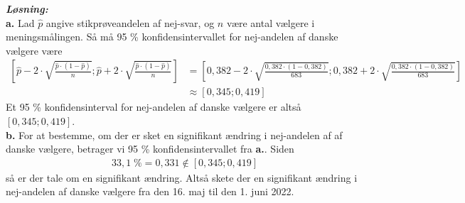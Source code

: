 \documentclass{article}
\newcommand{\sol}{\setlength{\parindent}{0cm}\textbf{\textit{Løsning:}}\setlength{\parindent}{1cm}}
\begin{document}
\sol \\
\textbf{a.}
Lad $\hat p $ angive stikprøveandelen af nej-svar, og $n$ være antal vælgere i meningsmålingen.
Så må 95 \% konfidensintervallet for nej-andelen af danske vælgere være 
\begin{equation*}
\begin{split}
  \left[\hat p - 2 \cdot \sqrt{\frac{\hat p \cdot (1- \hat p)}{n}} ; \hat p + 2 \cdot \sqrt{\frac{\hat p \cdot (1- \hat p)}{n}} \right]&=\left[0,382 - 2 \cdot \sqrt{\frac{0,382 \cdot (1-0,382)}{683}} ; 0,382 + 2 \cdot \sqrt{\frac{0,382 \cdot (1-0,382)}{683}} \right]\\
  &\approx \left[0,345; 0,419\right]
\end{split}
\end{equation*}
Et 95 \% konfidensinterval for nej-andelen af danske vælgere er altså $[0,345; 0,419]$.\\[1ex]
\textbf{b.}
For at bestemme, om der er sket en signifikant ændring i nej-andelen af af danske vælgere, betrager vi 95 \% konfidensintervallet fra \textbf{a.}.
Siden 
\begin{equation*}
\begin{split}
  33,1 \;\%=0,331 \notin [0,345;0,419]
\end{split}
\end{equation*}
så er der tale om en signifikant ændring.
Altså skete der en signifikant ændring i nej-andelen af danske vælgere fra den 16. maj til den 1. juni 2022.
\end{document}
